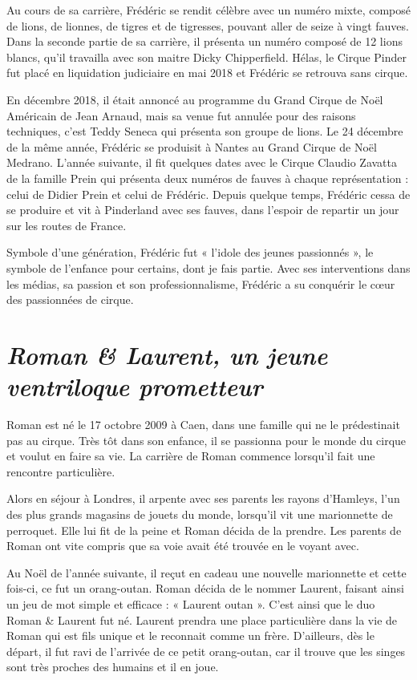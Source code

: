 Au cours de sa carrière, Frédéric se rendit célèbre avec un numéro mixte, composé de lions, de lionnes, de tigres et de tigresses, pouvant aller de seize à vingt fauves. Dans la seconde partie de sa carrière, il présenta un numéro composé de 12 lions blancs, qu'il travailla avec son maitre Dicky Chipperfield. Hélas, le Cirque Pinder fut placé en liquidation judiciaire en mai 2018 et Frédéric se retrouva sans cirque.

En décembre 2018, il était annoncé au programme du Grand Cirque de Noël Américain de Jean Arnaud, mais sa venue fut annulée pour des raisons techniques, c’est Teddy Seneca qui présenta son groupe de lions. Le 24 décembre de la même année, Frédéric se produisit à Nantes au Grand Cirque de Noël Medrano. L’année suivante, il fit quelques dates avec le Cirque Claudio Zavatta de la famille Prein qui présenta deux numéros de fauves à chaque représentation : celui de Didier Prein et celui de Frédéric. Depuis quelque temps, Frédéric cessa de se produire et vit à Pinderland avec ses fauves, dans l’espoir de repartir un jour sur les routes de France.

Symbole d’une génération, Frédéric fut « l’idole des jeunes passionnés », le symbole de l’enfance pour certains, dont je fais partie. Avec ses interventions dans les médias, sa passion et son professionnalisme, Frédéric a su conquérir le cœur des passionnées de cirque. 

\section*{\texorpdfstring{\textit{Roman \& Laurent, un jeune ventriloque prometteur}}{Roman et Laurent, un jeune ventriloque prometteur}}
{}
\noindent
Roman est né le 17 octobre 2009 à Caen, dans une famille qui ne le prédestinait pas au cirque. Très tôt dans son enfance, il se passionna pour le monde du cirque et voulut en faire sa vie. La carrière de Roman commence lorsqu’il fait une rencontre particulière.

Alors en séjour à Londres, il arpente avec ses parents les rayons d’Hamleys, l’un des plus grands magasins de jouets du monde, lorsqu’il vit une marionnette de perroquet. Elle lui fit de la peine et Roman décida de la prendre. Les parents de Roman ont vite compris que sa voie avait été trouvée en le voyant avec.

Au Noël de l’année suivante, il reçut en cadeau une nouvelle marionnette et cette fois-ci, ce fut un orang-outan. Roman décida de le nommer Laurent, faisant ainsi un jeu de mot simple et efficace : « Laurent outan ». C’est ainsi que le duo Roman \& Laurent fut né. Laurent prendra une place particulière dans la vie de Roman qui est fils unique et le reconnait comme un frère. D’ailleurs, dès le départ, il fut ravi de l’arrivée de ce petit orang-outan, car il trouve que les singes sont très proches des humains et il en joue.


